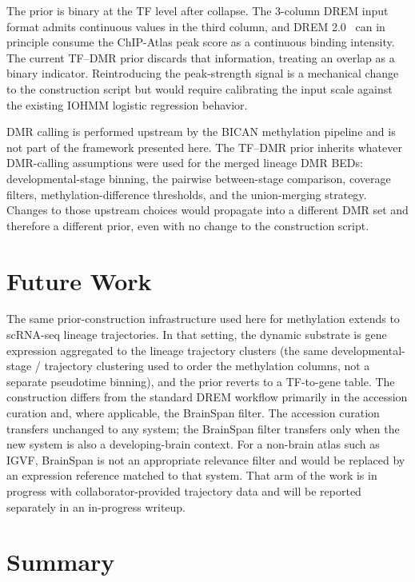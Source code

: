 \documentclass[sigconf,nonacm]{acmart}
\begin{document}
The prior is binary at the TF level after collapse. The 3-column
DREM input format admits continuous values in the third column, and
DREM 2.0~\cite{schulz2012drem2} can in principle consume the
ChIP-Atlas peak score as a continuous binding intensity. The current
TF--DMR prior discards that information, treating an overlap as a
binary indicator. Reintroducing the peak-strength signal is a
mechanical change to the construction script but would require
calibrating the input scale against the existing IOHMM logistic
regression behavior.

DMR calling is performed upstream by the BICAN methylation pipeline
and is not part of the framework presented here. The TF--DMR prior
inherits whatever DMR-calling assumptions were used for the merged
lineage DMR BEDs: developmental-stage binning, the pairwise
between-stage comparison, coverage filters, methylation-difference
thresholds, and the union-merging strategy.
Changes to those upstream choices would propagate into a different
DMR set and therefore a different prior, even with no change to the
construction script.

\section{Future Work}
\label{sec:future}

The same prior-construction infrastructure used here for methylation
extends to scRNA-seq lineage trajectories. In that setting, the
dynamic substrate is gene expression aggregated to the lineage
trajectory clusters (the same developmental-stage / trajectory
clustering used to order the methylation columns, not a separate
pseudotime binning), and the prior reverts to a TF-to-gene
table. The construction differs from the standard DREM workflow
primarily in the accession curation and, where applicable, the
BrainSpan filter. The accession curation transfers unchanged to any
system; the BrainSpan filter transfers only when the new system is
also a developing-brain context. For a non-brain atlas such as
IGVF, BrainSpan is not an appropriate relevance filter and would be
replaced by an expression reference matched to that system. That arm
of the work is in progress with collaborator-provided trajectory
data and will be reported separately in an in-progress writeup.

\section{Summary}
\label{sec:summary}
\end{document}
